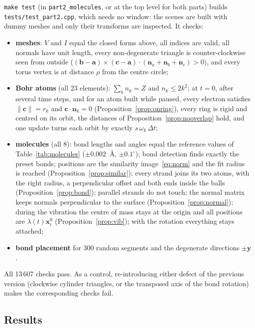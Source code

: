 \documentclass[a4paper, 11pt]{article}
\newcommand{\code}[1]{\texttt{#1}}
\begin{document}
\code{make test} (in \code{part2\_molecules}, or at the top level for both parts) builds \code{tests/test\_part2.cpp}, which needs no window: the scenes
are built with dummy meshes and only their transforms are inspected. It checks:
\begin{itemize}
  \item \textbf{meshes}: $V$ and $I$ equal the closed forms above, all indices are valid, all normals have unit length, every non-degenerate triangle is
        counter-clockwise seen from outside ($(\mathbf b-\mathbf a)\times(\mathbf c-\mathbf a)\cdot(\mathbf n_a+\mathbf n_b+\mathbf n_c)>0$), and every torus vertex is
        at distance $\rho$ from the centre circle;
  \item \textbf{Bohr atoms} (all 23 elements): $\sum_k n_k=Z$ and $n_k\le2k^2$; at $t=0$, after several time steps, and for an atom built while paused,
        every electron satisfies $\|\mathbf c\|=r_k$ and $\mathbf c\cdot\mathbf n_k=0$ (Proposition~\ref{prop:onring}), every ring is rigid and centred on its
        orbit, the distances of Proposition~\ref{prop:nooverlap} hold, and one update turns each orbit by exactly $s\,\omega_k\,\Delta t$;
  \item \textbf{molecules} (all 8): bond lengths and angles equal the reference values of Table~\ref{tab:molecules} ($\pm0.002$~{\AA}, $\pm0.1^\circ$);
        bond detection finds exactly the preset bonds; positions are the similarity image~\eqref{eq:norm} and the fit radius is reached
        (Proposition~\ref{prop:similar}); every strand joins its two atoms, with the right radius, a perpendicular offset and both ends inside the balls
        (Proposition~\ref{prop:bond}); parallel strands do not touch; the normal matrix keeps normals perpendicular to the surface
        (Proposition~\ref{prop:normal}); during the vibration the centre of mass stays at the origin and all positions are $\lambda(t)\mathbf x_i^0$
        (Proposition~\ref{prop:vib}); with the rotation everything stays attached;
  \item \textbf{bond placement} for 300 random segments and the degenerate directions $\pm\hat{\mathbf y}$.
\end{itemize}
All 13\,607 checks pass. As a control, re-introducing either defect of the previous version (clockwise cylinder triangles, or the transposed axis
of the bond rotation) makes the corresponding checks fail.

\subsection{Results}\label{sec:results2}
\end{document}
